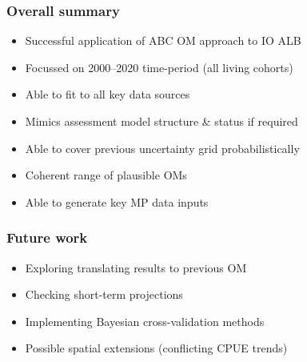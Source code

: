 \documentclass{beamer}
\begin{document}
\begin{frame}
    \frametitle{Overall summary}
\begin{itemize}
    \item Successful application of ABC OM approach to IO ALB 
    \item Focussed on 2000--2020 time-period (all living cohorts)
    \item Able to fit to all key data sources
    \item Mimics assessment model structure \& status if required
    \item Able to cover previous uncertainty grid probabilistically
    \item Coherent range of plausible OMs
    \item Able to generate key MP data inputs
\end{itemize}
\end{frame}
\begin{frame}
    \frametitle{Future work}
\begin{itemize}
    \item Exploring translating results to previous OM
    \item Checking short-term projections
    \item Implementing Bayesian cross-validation methods
    \item Possible spatial extensions (conflicting CPUE trends)
\end{itemize}
\end{frame}
\end{document}

